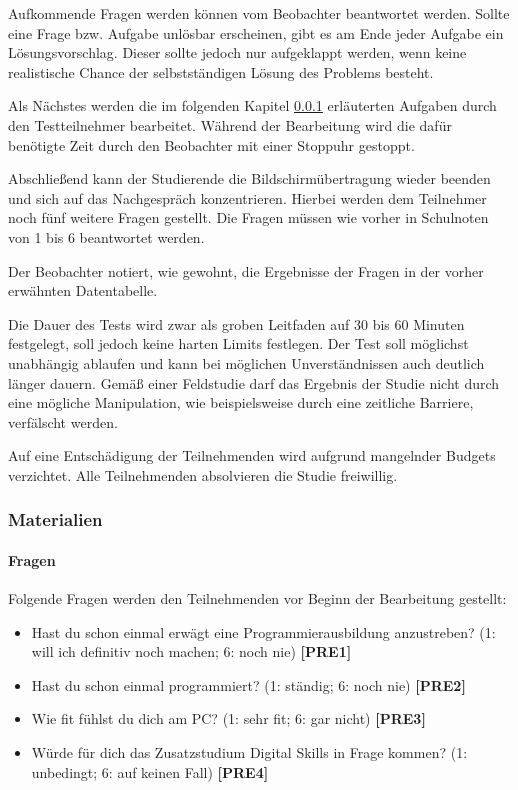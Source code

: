 Aufkommende Fragen werden können vom Beobachter beantwortet werden. Sollte eine
Frage bzw. Aufgabe unlösbar erscheinen, gibt es am Ende jeder Aufgabe ein
Lösungsvorschlag. Dieser sollte jedoch nur aufgeklappt werden, wenn keine
realistische Chance der selbstständigen Lösung des Problems besteht.

Als Nächstes werden die im folgenden Kapitel \ref{studie-materialien} erläuterten
Aufgaben durch den Testteilnehmer bearbeitet. Während der Bearbeitung wird
die dafür benötigte Zeit durch den Beobachter mit einer Stoppuhr gestoppt.

Abschließend kann der Studierende die Bildschirmübertragung wieder beenden und
sich auf das Nachgespräch konzentrieren. Hierbei werden dem Teilnehmer noch
fünf weitere Fragen gestellt. Die Fragen müssen wie vorher in Schulnoten von 1
bis 6 beantwortet werden.

Der Beobachter notiert, wie gewohnt, die Ergebnisse der Fragen in der
vorher erwähnten Datentabelle.

Die Dauer des Tests wird zwar als groben Leitfaden auf 30 bis 60 Minuten
festgelegt, soll jedoch keine harten Limits festlegen. Der Test soll möglichst
unabhängig ablaufen und kann bei möglichen Unverständnissen auch deutlich länger
dauern. Gemäß einer Feldstudie darf das Ergebnis der Studie nicht durch eine
mögliche Manipulation, wie beispielsweise durch eine zeitliche Barriere,
verfälscht werden.

Auf eine Entschädigung der Teilnehmenden wird aufgrund mangelnder Budgets
verzichtet. Alle Teilnehmenden absolvieren die Studie freiwillig.

\subsubsection{Materialien}\label{studie-materialien}
\paragraph{Fragen}
Folgende Fragen werden den Teilnehmenden vor Beginn der Bearbeitung gestellt:

\begin{itemize}
    \item Hast du schon einmal erwägt eine Programmierausbildung anzustreben?
    (1: will ich definitiv noch machen; 6: noch nie) \textbf{[PRE1]}
    \item Hast du schon einmal programmiert? (1: ständig; 6: noch nie)
    \textbf{[PRE2]}
    \item Wie fit fühlst du dich am PC? (1: sehr fit; 6: gar nicht)
    \textbf{[PRE3]}
    \item Würde für dich das Zusatzstudium Digital Skills in Frage kommen?
    (1: unbedingt; 6: auf keinen Fall) \textbf{[PRE4]}
\end{itemize}

